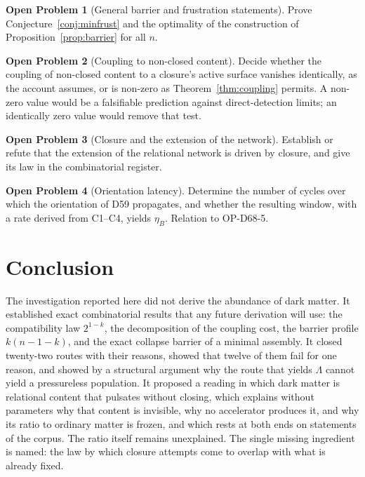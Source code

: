 \documentclass[11pt,a4paper]{article}
\theoremstyle{plain}
\theoremstyle{definition}
\newtheorem{openproblem}{Open Problem}
\theoremstyle{remark}
\begin{document}
\begin{openproblem}[General barrier and frustration statements]\label{op:general}
Prove Conjecture~\ref{conj:minfrust} and the optimality of the construction of Proposition~\ref{prop:barrier} for all $n$.
\end{openproblem}

\begin{openproblem}[Coupling to non-closed content]\label{op:coupling}
Decide whether the coupling of non-closed content to a closure's active surface vanishes identically, as the account assumes, or is non-zero as Theorem~\ref{thm:coupling} permits. A non-zero value would be a falsifiable prediction against direct-detection limits; an identically zero value would remove that test.
\end{openproblem}

\begin{openproblem}[Closure and the extension of the network]\label{op:space}
Establish or refute that the extension of the relational network is driven by closure, and give its law in the combinatorial register.
\end{openproblem}

\begin{openproblem}[Orientation latency]\label{op:latency}
Determine the number of cycles over which the orientation of D59 propagates, and whether the resulting window, with a rate derived from C1--C4, yields $\eta_B$. Relation to OP-D68-5.
\end{openproblem}

\section{Conclusion}
\label{sec:conclusion}

The investigation reported here did not derive the abundance of dark matter. It established exact combinatorial results that any future derivation will use: the compatibility law $2^{1-k}$, the decomposition of the coupling cost, the barrier profile $k(n-1-k)$, and the exact collapse barrier of a minimal assembly. It closed twenty-two routes with their reasons, showed that twelve of them fail for one reason, and showed by a structural argument why the route that yields $\Lambda$ cannot yield a pressureless population. It proposed a reading in which dark matter is relational content that pulsates without closing, which explains without parameters why that content is invisible, why no accelerator produces it, and why its ratio to ordinary matter is frozen, and which rests at both ends on statements of the corpus. The ratio itself remains unexplained. The single missing ingredient is named: the law by which closure attempts come to overlap with what is already fixed.
\end{document}
